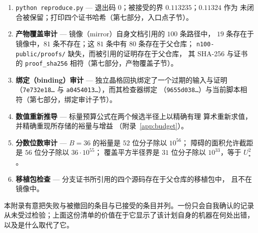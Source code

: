 \begin{enumerate}[leftmargin=1.6em,itemsep=3pt]
\item \texttt{python reproduce.py} --- 退出码 $0$；被接受的界 $0.113235$；$0.11324$ 作为
未闭合被保留；打印四个证书哈希（第七部分，入口点子节）。
\item \textbf{产物覆盖审计} --- 镜像（mirror）自身文档引用的 $100$ 条路径中，
$19$ 条存在于镜像中，$81$ 条不存在；这 $81$ 条中有 $80$ 条存在于父仓库；
\texttt{n100-\allowbreak{}public/\allowbreak{}proofs/\allowbreak{}} 缺失，而被引用的证明存在于父仓库，
其 SHA-256 与证书的 \texttt{proof\_\allowbreak{}sha256} 相符（第七部分，产物覆盖子节）。
\item \textbf{绑定（binding）审计} --- 独立晶格回执绑定了一个过期的输入与证明
（\texttt{7e732e18\ldots} 与 \texttt{a0454013\ldots}），而其检查器绑定
（\texttt{9655d038\ldots}）与当前脚本相符（第七部分，绑定审计子节）。
\item \textbf{数值重新推导} --- 标量预算公式在两个候选半径上以精确有理
算术重新求值，并精确重现所存储的裕量与增益
（附录~\ref{app:budget}）。
\item \textbf{分数位数审计} --- $B=36$ 的裕量是 $52$ 位分子除以 $10^{56}$；
障碍的面积允许截距是 $56$ 位分子除以 $36\cdot10^{55}$；
覆盖平方半径界是 $31$ 位分子除以 $10^{33}$，等于 $U_\star^2$。
\item \textbf{移植包检查} --- 分支证书所引用的四个源码存在于父仓库的移植包中，
且不在镜像中。
\end{enumerate}

\begin{remark}
本附录有意把失败与被撤回的条目与已接受的条目并列。一份只会自我确认的记录从未受过检验；上面这份清单的价值在于它显示了该计划自身的机器在何处出错，以及是什么取代了它。
\end{remark}
